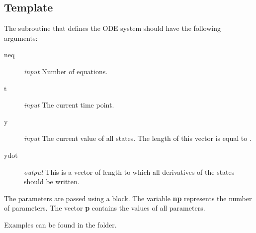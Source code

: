 \subsection{Template}
The \Fortran subroutine that defines the ODE system should have the following arguments:
\begin{description}
 \item[neq] \emph{input} Number of equations.
 \item[t] \emph{input} The current time point.
 \item[y] \emph{input} The current value of all states. The length of this vector is equal to .
 \item[ydot] \emph{output} This is a vector of length  to which all derivatives of the states should be written.
\end{description}
The parameters are passed using a  block. The variable \textbf{np} represents the number of parameters. The vector \textbf{p} contains the values of all parameters.



Examples can be found in the  folder.